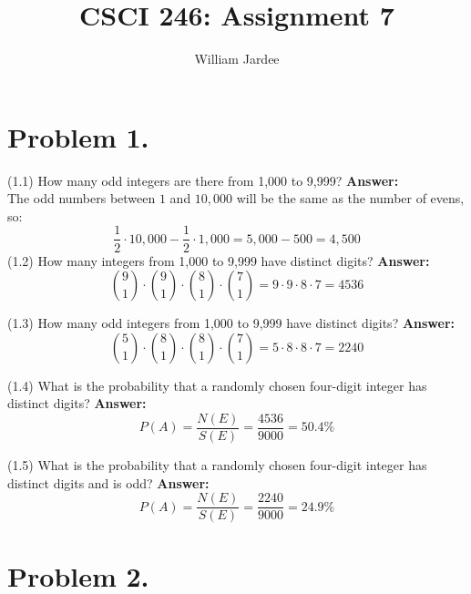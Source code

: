 \documentclass[11pt]{article}
\begin{document}
\date{}

\title{CSCI 246: Assignment 7}

\author{William Jardee}

\maketitle

 
\section*{Problem 1.}

\noindent
(1.1) How many odd integers are there from 1,000 to 9,999?
\newline
\noindent
{\bf Answer:}\\
The odd numbers between $1$ and $10,000$ will be the same as the number of evens, so:\\
\[\frac{1}{2}\cdot 10,000 - \frac{1}{2}\cdot 1,000 = 5,000-500 = 4,500\]
\newline
\noindent
(1.2) How many integers from 1,000 to 9,999 have distinct digits?
\newline
\noindent
{\bf Answer:}\\
\[{9 \choose 1}\cdot{9 \choose 1} \cdot {8 \choose 1}\cdot {7 \choose 1} = 9\cdot 9 \cdot 8 \cdot 7 = 4536\]
\newline

\noindent
(1.3) How many odd integers from 1,000 to 9,999 have distinct digits?
\newline
\noindent
{\bf Answer:}\\
\[{5 \choose 1} \cdot {8 \choose 1} \cdot {8 \choose 1} \cdot {7 \choose 1} = 5 \cdot 8\cdot 8\cdot 7 = 2240\]
\newline

\noindent
(1.4) What is the probability that a randomly chosen four-digit integer has distinct digits?
\newline
\noindent
{\bf Answer:}\\
\[P(A) = \frac{N(E)}{S(E)} = \frac{4536}{9000} = 50.4\%\]
\newline

\noindent
(1.5) What is the probability that a randomly chosen four-digit integer has distinct digits and is odd?
\newline
\noindent
{\bf Answer:}\\
\[P(A) = \frac{N(E)}{S(E)} = \frac{2240}{9000} = 24.9\%\]
\newline
\newpage

\section*{Problem 2.}
\end{document}
